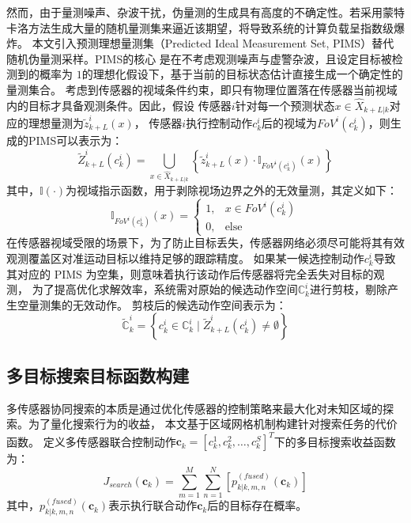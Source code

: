 然而，由于量测噪声、杂波干扰，伪量测的生成具有高度的不确定性。若采用蒙特卡洛方法生成大量的随机量测集来逼近该期望，将导致系统的计算负载呈指数级爆炸。
本文引入预测理想量测集（Predicted Ideal Measurement Set, PIMS）替代随机伪量测采样。PIMS的核心
是在不考虑观测噪声与虚警杂波，且设定目标被检测到的概率为 $1$的理想化假设下，基于当前的目标状态估计直接生成一个确定性的量测集合。
考虑到传感器的视域条件约束，即只有物理位置落在传感器当前视域内的目标才具备观测条件。因此，假设
传感器$i$针对每一个预测状态$x\in\hat{X}_{k+L|k}$对应的理想量测为$\tilde{z}_{k+L}^i(x)$，
传感器$i$执行控制动作$c_k^i$后的视域为$FoV^i(c_k^i)$，则生成的PIMS可以表示为：
\begin{equation}
\tilde{Z}_{k+L}^i(c_k^i)=\bigcup_{x\in\hat{X}_{k+L|k}}\left\{\tilde{z}_{k+L}^i(x)\cdot\mathbb{I}_{FoV^i(c_k^i)}(x)\right\}
\end{equation}
其中，$\mathbb{I}(\cdot)$为视域指示函数，用于剥除视场边界之外的无效量测，其定义如下：
\begin{equation}
\mathbb{I}_{FoV^i(c_k^i)}(x)=\begin{cases}1, &x\in FoV^i(c_k^i)\\0, &\text{else} \end{cases}
\end{equation}
在传感器视域受限的场景下，为了防止目标丢失，传感器网络必须尽可能将其有效观测覆盖区对准运动目标以维持足够的跟踪精度。
如果某一候选控制动作$c_k^i$导致其对应的 PIMS 为空集，则意味着执行该动作后传感器将完全丢失对目标的观测，
为了提高优化求解效率，系统需对原始的候选动作空间$\mathbb{C}_k^i$进行剪枝，剔除产生空量测集的无效动作。
剪枝后的候选动作空间表示为：
\begin{equation}
\tilde{\mathbb{C}}_k^i=\left\{c_k^i\in\mathbb{C}_k^i\mid\tilde{Z}_{k+L}^i(c_k^i)\neq\emptyset\right\}
\end{equation}

\subsection{多目标搜索目标函数构建}
多传感器协同搜索的本质是通过优化传感器的控制策略来最大化对未知区域的探索。为了量化搜索行为的收益，
本文基于区域网格机制构建针对搜索任务的代价函数。
定义多传感器联合控制动作$\mathbf{c}_k=[c_k^1,c_k^2,\ldots,c_k^S]^T$下的多目标搜索收益函数为：
\begin{equation}
J_{search}(\mathbf{c}_k) = \sum_{m=1}^M\sum_{n=1}^N\left[p_{k|k,m,n}^{(fused)}(\mathbf{c}_k)\right]
\end{equation}
其中，$p_{k|k,m,n}^{(fused)}(\mathbf{c}_k)$表示执行联合动作$\mathbf{c}_k$后的目标存在概率。

